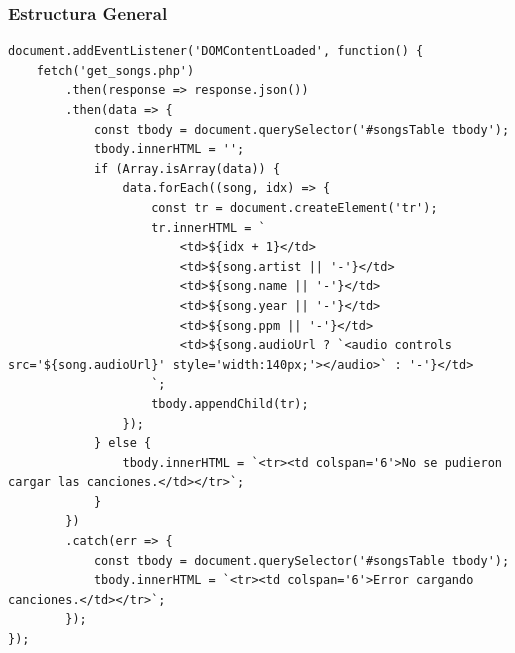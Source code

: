 \documentclass[a4paper,12pt]{article}
\begin{document}
\subsubsection{Estructura General}
\begin{verbatim}
document.addEventListener('DOMContentLoaded', function() {
    fetch('get_songs.php')
        .then(response => response.json())
        .then(data => {
            const tbody = document.querySelector('#songsTable tbody');
            tbody.innerHTML = '';
            if (Array.isArray(data)) {
                data.forEach((song, idx) => {
                    const tr = document.createElement('tr');
                    tr.innerHTML = `
                        <td>${idx + 1}</td>
                        <td>${song.artist || '-'}</td>
                        <td>${song.name || '-'}</td>
                        <td>${song.year || '-'}</td>
                        <td>${song.ppm || '-'}</td>
                        <td>${song.audioUrl ? `<audio controls src='${song.audioUrl}' style='width:140px;'></audio>` : '-'}</td>
                    `;
                    tbody.appendChild(tr);
                });
            } else {
                tbody.innerHTML = `<tr><td colspan='6'>No se pudieron cargar las canciones.</td></tr>`;
            }
        })
        .catch(err => {
            const tbody = document.querySelector('#songsTable tbody');
            tbody.innerHTML = `<tr><td colspan='6'>Error cargando canciones.</td></tr>`;
        });
});
\end{verbatim}
\end{document}
